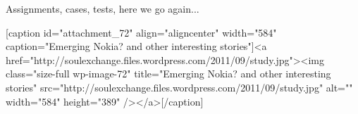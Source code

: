 \begin{post}
	\begin{content}
Assignments, cases, tests, here we go again...



[caption id="attachment_72" align="aligncenter" width="584" caption="Emerging Nokia? and other interesting stories"]<a href="http://soulexchange.files.wordpress.com/2011/09/study.jpg"><img class="size-full wp-image-72" title="Emerging Nokia? and other interesting stories" src="http://soulexchange.files.wordpress.com/2011/09/study.jpg" alt="" width="584" height="389" /></a>[/caption] 
	\end{content}
\end{post}
